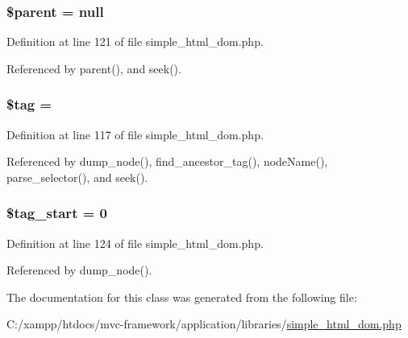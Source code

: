 \hypertarget{classsimple__html__dom__node_a4e2313a4b35b72a06ac45fd38960f677}{}
\subsubsection[{\$parent}]{\setlength{\rightskip}{0pt plus 5cm}\${\bf parent} = null}\label{classsimple__html__dom__node_a4e2313a4b35b72a06ac45fd38960f677}


Definition at line 121 of file simple\+\_\+html\+\_\+dom.\+php.



Referenced by parent(), and seek().

\hypertarget{classsimple__html__dom__node_a81d5015d41ed8ec66e9db8cdc5db9555}{}
\subsubsection[{\$tag}]{\setlength{\rightskip}{0pt plus 5cm}\$tag = \textquotesingle{}}\label{classsimple__html__dom__node_a81d5015d41ed8ec66e9db8cdc5db9555}


Definition at line 117 of file simple\+\_\+html\+\_\+dom.\+php.



Referenced by dump\+\_\+node(), find\+\_\+ancestor\+\_\+tag(), node\+Name(), parse\+\_\+selector(), and seek().

\hypertarget{classsimple__html__dom__node_af1af90d3ddaae5df362bdbfa7a5eb7e4}{}
\subsubsection[{\$tag\+\_\+start}]{\setlength{\rightskip}{0pt plus 5cm}\$tag\+\_\+start = 0}\label{classsimple__html__dom__node_af1af90d3ddaae5df362bdbfa7a5eb7e4}


Definition at line 124 of file simple\+\_\+html\+\_\+dom.\+php.



Referenced by dump\+\_\+node().



The documentation for this class was generated from the following file\+:\begin{DoxyCompactItemize}
\item 
C\+:/xampp/htdocs/mvc-\/framework/application/libraries/\hyperlink{simple__html__dom_8php}{simple\+\_\+html\+\_\+dom.\+php}\end{DoxyCompactItemize}
